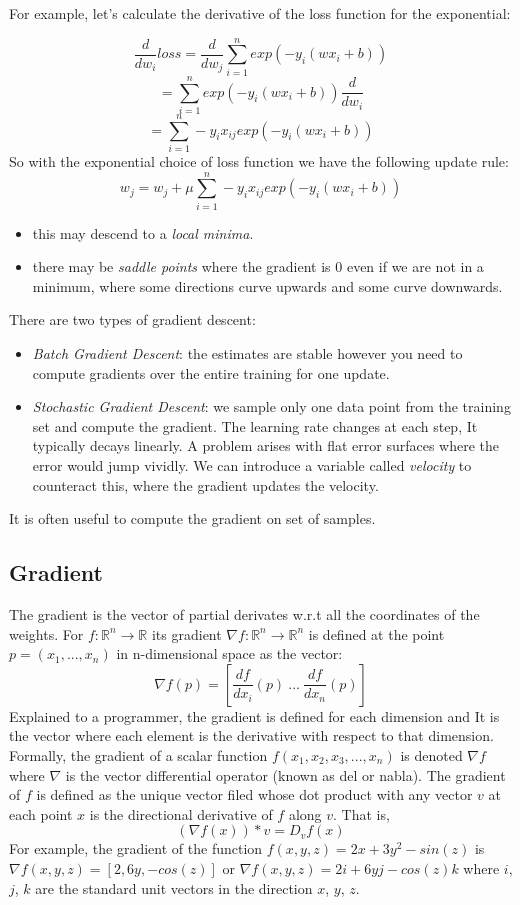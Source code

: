 \documentclass[11pt]{article}
\begin{document}
For example, let's calculate the derivative of the loss function for the
exponential:

\[\frac{d}{dw_i} loss = \frac{d}{dw_j} \sum_{i=1}^{n}exp(-y_i(wx_i+b))\]
\[ = \sum_{i=1}^{n}exp(-y_i(wx_i+b))\frac{d}{dw_i}\]
\[= \sum_{i=1}^n -y_ix_{ij}exp(-y_i(wx_i+b))\] So with the exponential
choice of loss function we have the following update rule:
\[w_j = w_j + \mu \sum_{i=1}^n -y_ix_{ij}exp(-y_i(wx_i+b))\]

\begin{itemize}
\tightlist
\item
  this may descend to a \emph{local minima}.
\item
  there may be \emph{saddle points} where the gradient is 0 even if we
  are not in a minimum, where some directions curve upwards and some
  curve downwards.
\end{itemize}

There are two types of gradient descent:

\begin{itemize}
\tightlist
\item
  \emph{Batch Gradient Descent}: the estimates are stable however you
  need to compute gradients over the entire training for one update.
\item
  \emph{Stochastic Gradient Descent}: we sample only one data point from
  the training set and compute the gradient. The learning rate changes
  at each step, It typically decays linearly. A problem arises with flat
  error surfaces where the error would jump vividly. We can introduce a
  variable called \emph{velocity} to counteract this, where the gradient
  updates the velocity.
\end{itemize}

It is often useful to compute the gradient on set of samples.

\subsection{Gradient}\label{gradient}

The gradient is the vector of partial derivates w.r.t all the
coordinates of the weights. For
\(f: \mathbb{R}^n \rightarrow \mathbb{R}\) its gradient
\(\nabla f:\mathbb{R}^n \rightarrow \mathbb{R}^n\) is defined at the
point \(p=(x_1, ..., x_n)\) in n-dimensional space as the vector:
\[\nabla f(p) = [\frac{df}{dx_i}(p)\ ...\ \frac{df}{dx_n}(p) ]\]
Explained to a programmer, the gradient is defined for each dimension
and It is the vector where each element is the derivative with respect
to that dimension. Formally, the gradient of a scalar function
\(f(x_1, x_2, x_3, ..., x_n)\) is denoted \(\nabla f\) where \(\nabla\)
is the vector differential operator (known as del or nabla). The
gradient of \(f\) is defined as the unique vector filed whose dot
product with any vector \(v\) at each point \(x\) is the directional
derivative of \(f\) along \(v\). That is, \[(\nabla f(x))*v = D_vf(x)\]
For example, the gradient of the function
\(f(x, y, z)=2x + 3y^2 - sin(z)\) is
\(\nabla f(x, y, z)=[2, 6y, -cos(z)]\) or
\(\nabla f(x, y, z)=2i+6yj-cos(z)k\) where \(i\), \(j\), \(k\) are the
standard unit vectors in the direction \(x\), \(y\), \(z\).
\end{document}
